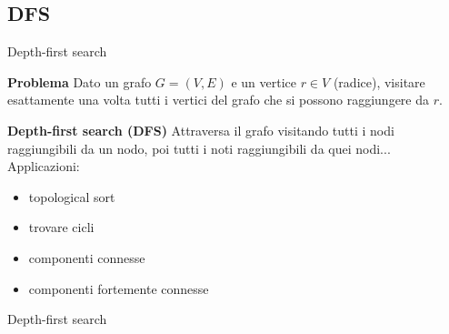\documentclass[compress]{beamer}
\begin{document}
\subsection{DFS}
\begin{frame}{Depth-first search}
  \begin{block}{\textbf{Problema}}
    Dato un grafo $G = (V, E)$ e un vertice $r \in V$ (radice), visitare esattamente una
     volta tutti i vertici del grafo che si possono raggiungere da $r$.
  \end{block}
  \begin{block}{\textbf{Depth-first search (DFS)}}
    Attraversa il grafo visitando tutti i nodi raggiungibili da un nodo, poi tutti i noti raggiungibili da quei nodi...
    Applicazioni:
    \begin{itemize}
    \item topological sort
    \item trovare cicli
    \item componenti connesse
    \item componenti fortemente connesse
    \end{itemize}
  \end{block}
\end{frame}

\begin{frame}[fragile]{Depth-first search}
\end{frame}
\end{document}
